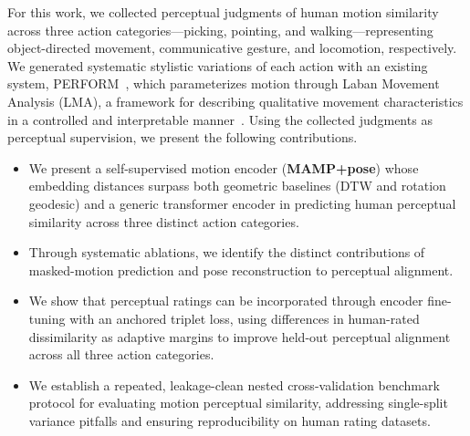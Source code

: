 \documentclass[letterpaper]{article} %
\begin{document}
For this work, we collected perceptual judgments of human motion similarity across three action categories—picking, pointing, and walking—representing object-directed movement, communicative gesture, and locomotion, respectively. We generated systematic stylistic variations of each action with an existing system, PERFORM~\citep{Durupinar2017-vg}, which parameterizes motion through Laban Movement Analysis (LMA), a framework for describing qualitative movement characteristics in a controlled and interpretable manner~\citep{laban1971effort}. Using the collected judgments as perceptual supervision, we present the following contributions.

\vspace{-0.5em}
\begin{itemize}
\item We present a self-supervised motion encoder (\textbf{MAMP+pose}) whose
  embedding distances surpass both geometric baselines (DTW and rotation geodesic) and a generic
  transformer encoder in predicting human perceptual similarity across three distinct action categories.
\item Through systematic ablations, we identify the distinct contributions of masked-motion prediction and pose reconstruction to perceptual alignment.
\item We show that perceptual ratings can be incorporated through encoder fine-tuning with an anchored triplet loss, using differences in human-rated dissimilarity as adaptive margins to improve held-out perceptual alignment across all three action categories.
\item We establish a repeated, leakage-clean nested cross-validation benchmark protocol for
  evaluating motion perceptual similarity, addressing single-split variance pitfalls and
  ensuring reproducibility on human rating datasets.
\end{itemize}
\end{document}
